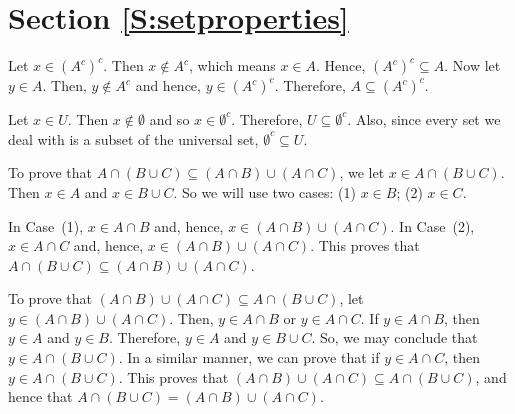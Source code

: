 \section*{Section \ref{S:setproperties}}
\renewcommand{\labelenumi}{(\textbf{\alph{enumi}})}

\begin{list}{\bf{\ref{exer:sec43-1}.}}
\item \begin{list}{\bf{(a)}}
\item Let  $x \in ( A^c )^c$.  Then  $x \notin A^c$, which means $x \in A$.  Hence, 
$( A^c )^c \subseteq A$.  Now let $y \in A$.  Then, 
$y \notin A^c$ and hence, $y \in \left( A^c \right)^c$.  Therefore, 
$A \subseteq \left( A^c \right)^c$.
\end{list}
\end{list}

\begin{list}{}
\item \begin{list}{\bf{(c)}}
\item Let $x \in U$.  Then $x \notin \emptyset$ and so $x \in \emptyset^c$.  Therefore, $U \subseteq \emptyset^c$.  Also, since every set we deal with is a subset of the universal set, 
 $\emptyset^c \subseteq U$.
\end{list}
\end{list}


\begin{list}{\bf{\ref{exer:distributive}.}}
\item To prove that $A \cap ( B \cup C ) \subseteq ( A \cap B ) 
\cup ( A \cap C )$, we let $x \in A \cap ( B \cup C )$.  Then $x \in A$ and 
$x \in B \cup C$.  So we will use two cases: 
(1) $x \in B$; (2) $x \in C$.

In Case~(1), $x \in A \cap B$ and, hence, $x \in ( A \cap B ) \cup ( A \cap C )$.  In Case~(2), 
$x \in  A \cap C$ and, hence, $x \in ( A \cap B ) \cup ( A \cap C )$.  This proves that $A \cap ( B \cup C ) \subseteq ( A \cap B ) \cup ( A \cap C )$.

To prove that $\left( A \cap B \right) \cup \left( A \cap C \right) \subseteq 
A \cap \left( B \cup C \right)$,  
let $y \in \left( A \cap B \right) \cup \left( A \cap C \right)$.  Then, $y \in A \cap B$ or 
$y \in A \cap C$.  If $y \in A \cap B$, then $y \in A$ and $y \in B$.  Therefore, $y \in A$ and 
$y \in B \cup C$.  So, we may conclude that $y \in A \cap \left( B \cup C \right)$.  In a similar manner, we can prove that if $y \in A \cap C$, then $y \in A \cap \left( B \cup C \right)$.  This proves that $\left( A \cap B \right) \cup \left( A \cap C \right) \subseteq 
A \cap \left( B \cup C \right)$, and hence that $A \cap \left( B \cup C \right) = \left( A \cap B \right) \cup \left( A \cap C \right)$. 

\end{list}


